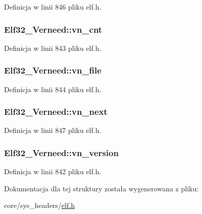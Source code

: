Definicja w linii 846 pliku elf.\-h.

\hypertarget{struct_elf32___verneed_a8c8c56b63ee1f38cf5568fa7bd5b4f73}{
\subsubsection[{vn\-\_\-cnt}]{ Elf32\-\_\-\-Verneed\-::vn\-\_\-cnt}}\label{struct_elf32___verneed_a8c8c56b63ee1f38cf5568fa7bd5b4f73}


Definicja w linii 843 pliku elf.\-h.

\hypertarget{struct_elf32___verneed_a71c12598274c795cca809b99462e062a}{
\subsubsection[{vn\-\_\-file}]{ Elf32\-\_\-\-Verneed\-::vn\-\_\-file}}\label{struct_elf32___verneed_a71c12598274c795cca809b99462e062a}


Definicja w linii 844 pliku elf.\-h.

\hypertarget{struct_elf32___verneed_ae3819b6239b81ed5c8ce4f8710176870}{
\subsubsection[{vn\-\_\-next}]{ Elf32\-\_\-\-Verneed\-::vn\-\_\-next}}\label{struct_elf32___verneed_ae3819b6239b81ed5c8ce4f8710176870}


Definicja w linii 847 pliku elf.\-h.

\hypertarget{struct_elf32___verneed_ae87cf6c64587fcf3cd80ba2f6aa6b1bb}{
\subsubsection[{vn\-\_\-version}]{ Elf32\-\_\-\-Verneed\-::vn\-\_\-version}}\label{struct_elf32___verneed_ae87cf6c64587fcf3cd80ba2f6aa6b1bb}


Definicja w linii 842 pliku elf.\-h.



Dokumentacja dla tej struktury została wygenerowana z pliku\-:\begin{DoxyCompactItemize}
\item 
core/sys\-\_\-headers/\hyperlink{elf_8h}{elf.\-h}\end{DoxyCompactItemize}
